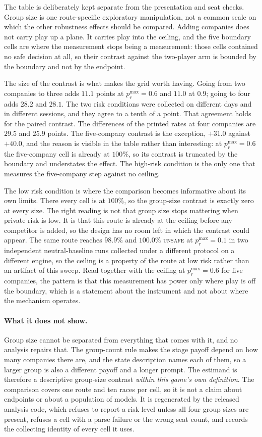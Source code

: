 \documentclass{article}
\newcommand{\Unsafe}{\textsc{unsafe}}
\begin{document}
The table is deliberately kept separate from the presentation and seat checks.
Group size is one route-specific exploratory manipulation, not a common scale on
which the other robustness effects should be compared. Adding companies does not
carry play up a plane. It carries play into the ceiling, and the five boundary
cells are where the measurement stops being a measurement: those cells
contained no safe decision at all, so their contrast against the two-player arm
is bounded by the boundary and not by the endpoint.

The size of the contrast is what makes the grid worth having. Going from two
companies to three adds $11.1$ points at $p_r^{\max}=0.6$ and $11.0$ at $0.9$;
going to four adds $28.2$ and $28.1$. The two risk conditions were collected on
different days and in different sessions, and they agree to a tenth of a point.
That agreement holds for the paired contrast. The differences of the printed
rates at four companies are $29.5$ and $25.9$ points. The five-company contrast is the exception, $+31.0$ against $+40.0$, and the
reason is visible in the table rather than interesting: at $p_r^{\max}=0.6$ the
five-company cell is already at $100\%$, so its contrast is truncated by the
boundary and understates the effect. The high-risk condition is the only one
that measures the five-company step against no ceiling.

The low risk condition is where the comparison becomes informative about its
own limits. There every cell is at $100\%$, so the group-size contrast is
exactly zero at every size. The right reading is not that group size stops
mattering when private risk is low. It is that this route is already at the
ceiling before any competitor is added, so the design has no room left in which
the contrast could appear. The same route reaches $98.9\%$ and $100.0\%$ \Unsafe{}
at $p_r^{\max}=0.1$ in two independent neutral-baseline runs collected under a
different protocol on a
different engine, so the ceiling is a property of the route at low risk rather
than an artifact of this sweep. Read together with the ceiling at
$p_r^{\max}=0.6$ for five companies, the pattern is that this measurement has
power only where play is off the boundary, which is a statement about the
instrument and not about where the mechanism operates.

\paragraph{What it does not show.} Group size cannot be separated from
everything that comes with it, and no analysis repairs that. The group-count
rule makes the stage payoff depend on how many companies there are, and the
state description names each of them, so a larger group is also a different
payoff and a longer prompt. The estimand is therefore a descriptive group-size
contrast \emph{within this game's own definition}. The comparison covers one route and ten
races per cell, so it is not a claim about endpoints or about a population of
models. It is regenerated by the released analysis code, which refuses to
report a risk level unless all four group sizes are present, refuses a cell with a parse
failure or the wrong seat count, and records the collecting identity of every
cell it uses.
\end{document}

